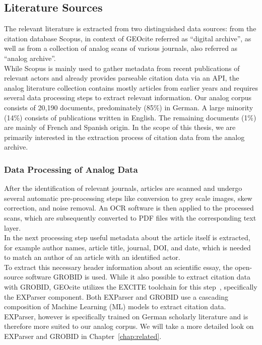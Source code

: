 \subsection{Literature Sources}
The relevant literature is extracted from two distinguished data sources: from the citation database Scopus, in context of GEOcite referred as \enquote{digital archive}, as well as from a collection of analog scans of various journals, also referred as \enquote{analog archive}.\\
While Scopus is mainly used to gather metadata from recent publications of relevant actors and already provides parseable citation data via an API, the analog literature collection contains mostly articles from earlier years and requires several data processing steps to extract relevant information. Our analog corpus consists of 20,190 documents, predominately (85\%) in German. A large minority (14\%) consists of publications written in English. The remaining documents (1\%) are mainly of French and Spanish origin. In the scope of this thesis, we are primarily interested in the extraction process of citation data from the analog archive.

\subsubsection{Data Processing of Analog Data}
After the identification of relevant journals, articles are scanned and undergo several automatic pre-processing steps like conversion to grey scale images, skew correction, and noise removal. An OCR software is then applied to the processed scans, which are subsequently converted to PDF files with the corresponding text layer.\\
In the next processing step useful metadata about the article itself is extracted, for example author names, article title, journal, DOI, and date, which is needed to match an author of an article with an identified actor.\\
To extract this necessary header information about an scientific essay, the open-source software GROBID \cite{lopez2009grobid} is used. While it also possible to extract citation data with GROBID, GEOcite utilizes the EXCITE toolchain for this step~\cite{excite_toolchain}, specifically the EXParser component. Both EXParser and GROBID use a cascading composition of Machine Learning (ML) models to extract citation data. EXParser, however is specifically trained on German scholarly literature and is therefore more suited to our analog corpus. We will take a more detailed look on EXParser and GROBID in Chapter~\ref{chap:related}.

